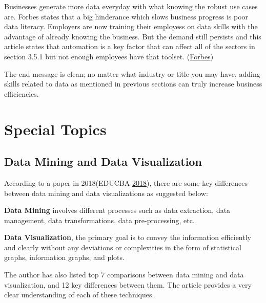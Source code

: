 \documentclass[]{book}
\begin{document}
Businesses generate more data everyday with what knowing the robust use cases are. Forbes states that a big hinderance which slows business progress is poor data literacy. Employers are now training their employess on data skills with the advantage of already knowing the business. But the demand still persists and this article states that automation is a key factor that can affect all of the sectors in section 3.5.1 but not enough employees have that toolset. (\href{https://www.forbes.com/sites/gilpress/2015/04/30/the-supply-and-demand-of-data-scientists-what-the-surveys-say/\#67b49d976b90}{Forbes})

The end message is clean; no matter what industry or title you may have, adding skills related to data as mentioned in previous sections can truly increase business efficiencies.

\hypertarget{special-topics}{%
\section{Special Topics}\label{special-topics}}

\hypertarget{data-mining-and-data-visualization}{%
\subsection{Data Mining and Data Visualization}\label{data-mining-and-data-visualization}}

According to a paper in 2018(EDUCBA \protect\hyperlink{ref-data_mining}{2018}), there are some key differences between data mining and data visualizations as suggested below:

\textbf{Data Mining} involves different processes such as data extraction, data management, data transformations, data pre-processing, etc.

\textbf{Data Visualization}, the primary goal is to convey the information efficiently and clearly without any deviations or complexities in the form of statistical graphs, information graphs, and plots.

The author has also listed top 7 comparisons between data mining and data visualization, and 12 key differences between them. The article provides a very clear understanding of each of these techniques.
\end{document}
